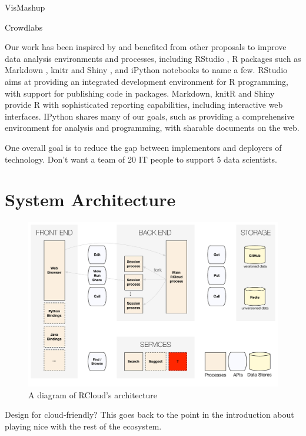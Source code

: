 \documentclass[review,journal]{vgtc}         %
\begin{document}
VisMashup
\cite{Santos:2009:VST}

Crowdlabs
\cite{Mates:2011:CSA}

Our work has been inspired by and benefited from other proposals
to improve data analysis environments and processes,
including RStudio \cite{RStudio:2013:SWA},
R packages such as Markdown \cite{Allaire:2014:MMR},
knitr \cite{Xie:2013:DDW}
and Shiny \cite{RStudio:2013:SWA},
and iPython notebooks \cite{Perez:2007:IAS}
to name a few. RStudio aims at providing an integrated development environment
for R programming, with support for publishing code in packages. Markdown,
knitR and Shiny provide R with sophisticated reporting capabilities, including
interactive web interfaces. IPython \cite{Perez:2007:IAS}
shares many of our goals, such as providing a comprehensive environment
for analysis and programming, with sharable documents on the web.

One overall goal is to reduce the gap between implementors and deployers
of technology. Don't want a team of 20 IT people to support 5 data scientists.


\section{System Architecture}

\begin{figure}
\hspace{-0.08\linewidth}
\includegraphics[width=1.1\linewidth]{fig/system/system.pdf}
\caption{\label{fig:system}A diagram of RCloud's architecture}
\end{figure}

Design for cloud-friendly? This goes back to the point in the
introduction about playing nice with the rest of the ecosystem.
\end{document}
